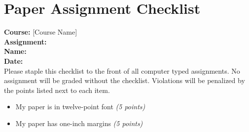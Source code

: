 \documentclass[11pt]{article}
\begin{document}
\thispagestyle{empty}

\section*{Paper Assignment Checklist}

\noindent
{\bf Course:} [Course Name] \bigskip 					\\
{\bf Assignment:} \shortstack{\underline{\hspace{6cm}}} \bigskip\bigskip\bigskip 	\\
{\bf Name:} \shortstack{\underline{\hspace{6cm}}} \bigskip 	\\
{\bf Date:} \shortstack{\underline{\hspace{6cm}}}			\\

\noindent
Please staple this checklist to the front of all computer typed assignments. No assignment will be graded without the checklist. Violations will be penalized by the points listed next to each item.

\vspace{1.0cm}

\hline\hline

\vspace{1.0cm}

\begin{minipage}{0.135\textwidth}
\end{minipage}
\begin{minipage}{0.8\textwidth}
\hline\vspace{0.25cm}
\begin{itemize}\itemsep-0.25em
	\item My paper is in twelve-point font {\it (5 points)}
\end{itemize}	
\hline\vspace{0.25cm} 
\end{minipage}

\vspace{0.5cm}

\begin{minipage}{0.135\textwidth}
\end{minipage}
\begin{minipage}{0.8\textwidth}
\hline\vspace{0.25cm}
\begin{itemize}\itemsep-0.25em
	\item My paper has one-inch margins {\it (5 points)}
\end{itemize}	
\hline\vspace{0.25cm} 
\end{minipage}
\end{document}
